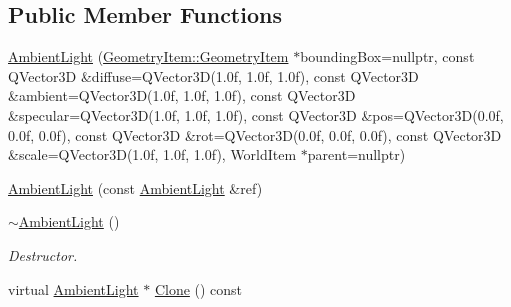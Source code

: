 \subsection*{Public Member Functions}
\begin{DoxyCompactItemize}
\item 
\mbox{\hyperlink{class_geometry_engine_1_1_geometry_world_item_1_1_geometry_light_1_1_ambient_light_af3902ecbb80cd014695d3ecfc35ace18}{Ambient\+Light}} (\mbox{\hyperlink{class_geometry_engine_1_1_geometry_world_item_1_1_geometry_item_1_1_geometry_item}{Geometry\+Item\+::\+Geometry\+Item}} $\ast$bounding\+Box=nullptr, const Q\+Vector3D \&diffuse=Q\+Vector3D(1.\+0f, 1.\+0f, 1.\+0f), const Q\+Vector3\+D \&ambient=\+Q\+Vector3\+D(1.\+0f, 1.\+0f, 1.\+0f), const Q\+Vector3\+D \&specular=\+Q\+Vector3\+D(1.\+0f, 1.\+0f, 1.\+0f), const Q\+Vector3\+D \&pos=\+Q\+Vector3\+D(0.\+0f, 0.\+0f, 0.\+0f), const Q\+Vector3\+D \&rot=\+Q\+Vector3\+D(0.\+0f, 0.\+0f, 0.\+0f), const Q\+Vector3\+D \&scale=\+Q\+Vector3\+D(1.\+0f, 1.\+0f, 1.\+0f), World\+Item $\ast$parent=nullptr)
\item 
\mbox{\hyperlink{class_geometry_engine_1_1_geometry_world_item_1_1_geometry_light_1_1_ambient_light_a7fd9257e58a7e3d41561f95f7bb383bf}{Ambient\+Light}} (const \mbox{\hyperlink{class_geometry_engine_1_1_geometry_world_item_1_1_geometry_light_1_1_ambient_light}{Ambient\+Light}} \&ref)
\item 
\mbox{\label{class_geometry_engine_1_1_geometry_world_item_1_1_geometry_light_1_1_ambient_light_ab60967e98b1d6931e49519fddb1b69af}} 
\mbox{\hyperlink{class_geometry_engine_1_1_geometry_world_item_1_1_geometry_light_1_1_ambient_light_ab60967e98b1d6931e49519fddb1b69af}{$\sim$\+Ambient\+Light}} ()
\begin{DoxyCompactList}\small\item\em Destructor. \end{DoxyCompactList}\item 
virtual \mbox{\hyperlink{class_geometry_engine_1_1_geometry_world_item_1_1_geometry_light_1_1_ambient_light}{Ambient\+Light}} $\ast$ \mbox{\hyperlink{class_geometry_engine_1_1_geometry_world_item_1_1_geometry_light_1_1_ambient_light_a890a2ff8ce5cde88cdc51b4e598ca9af}{Clone}} () const
\end{DoxyCompactItemize}
